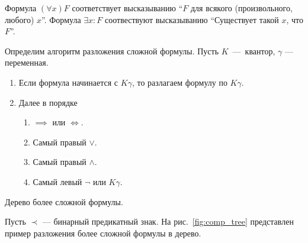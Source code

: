 Формула $(\forall x)F$ соответствует высказыванию
``$F$ для всякого (произвольного, любого) $x$''.
Формула $\exists x:F$ соотвествуют высказыванию
``Существует такой $x$, что $F$''.

Определим алгоритм разложения сложной формулы.
Пусть $K$~---~квантор, $\gamma$ --- переменная.
\begin{enumerate}
  \item{}Если формула начинается с $K\gamma$, то разлагаем формулу по $K\gamma$.
  \item{}Далее в порядке
  \begin{multicols}{2}
    \begin{enumerate}
      \item{}$\implies$ или $\iff$.
      \item{}Самый правый $\lor$.
      \item{}Самый правый $\land$.
      \item{}Самый левый $\lnot$ или $K\gamma$.
    \end{enumerate}
  \end{multicols}
\end{enumerate}

\begin{marginfigure}[-4cm]

  \caption{Дерево более сложной формулы.}\label{fig:comp_tree}
\end{marginfigure}

Пусть $\prec$ --- бинарный предикатный знак.
На рис.~\ref{fig:comp_tree} представлен пример разложения более
сложной формулы в дерево.

